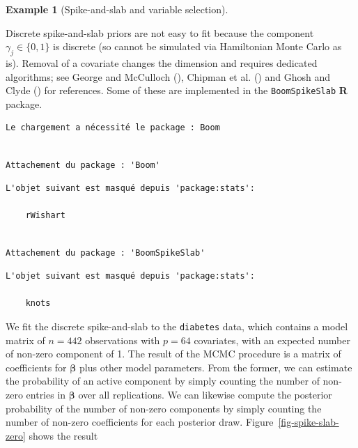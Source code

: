 \documentclass[
  11pt,
  letterpaper,
]{scrbook}
\theoremstyle{plain}
\theoremstyle{plain}
\theoremstyle{plain}
\theoremstyle{definition}
\theoremstyle{definition}
\newtheorem{example}{Example}[chapter]
\theoremstyle{definition}
\theoremstyle{remark}
\begin{document}
\begin{example}[Spike-and-slab and variable
selection]\protect\hypertarget{exm-spike-slab}{}\label{exm-spike-slab}

Discrete spike-and-slab priors are not easy to fit because the component
\(\gamma_j\in\{0,1\}\) is discrete (so cannot be simulated via
Hamiltonian Monte Carlo as is). Removal of a covariate changes the
dimension and requires dedicated algorithms; see George and McCulloch
(), Chipman et al.
() and Ghosh and Clyde
() for references. Some of these
are implemented in the \texttt{BoomSpikeSlab} \textbf{R} package.

\begin{verbatim}
Le chargement a nécessité le package : Boom
\end{verbatim}

\begin{verbatim}

Attachement du package : 'Boom'
\end{verbatim}

\begin{verbatim}
L'objet suivant est masqué depuis 'package:stats':

    rWishart
\end{verbatim}

\begin{verbatim}

Attachement du package : 'BoomSpikeSlab'
\end{verbatim}

\begin{verbatim}
L'objet suivant est masqué depuis 'package:stats':

    knots
\end{verbatim}

We fit the discrete spike-and-slab to the \texttt{diabetes} data, which
contains a model matrix of \(n=442\) observations with \(p=64\)
covariates, with an expected number of non-zero component of 1. The
result of the MCMC procedure is a matrix of coefficients for
\(\boldsymbol{\beta}\) plus other model parameters. From the former, we
can estimate the probability of an active component by simply counting
the number of non-zero entries in \(\boldsymbol{\beta}\) over all
replications. We can likewise compute the posterior probability of the
number of non-zero components by simply counting the number of non-zero
coefficients for each posterior draw. Figure~\ref{fig-spike-slab-zero}
shows the result


\end{example}
\end{document}
